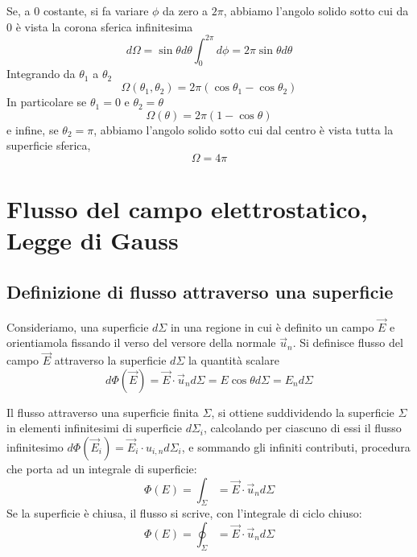 \documentclass[class=book, crop=false, oneside, 12pt]{standalone}
\begin{document}
Se, a \(0\) costante, si fa variare \(\phi\) da zero a \(2 \pi\), abbiamo l'angolo solido sotto cui da \(0\) è vista la corona sferica infinitesima
\begin{equation}
    d \Omega = \sin \theta d \theta \int_0^{2 \pi} d \phi = 2 \pi \sin \theta d \theta
\end{equation}
Integrando da \(\theta_1\) a \(\theta_2\)
\begin{equation*}
    \Omega (\theta_1 , \theta_2) = 2 \pi \left(\cos \theta_1 - \cos \theta_2 \right)
\end{equation*}
In particolare se \(\theta_1 = 0\) e \(\theta_2 = \theta\)
\begin{equation}
    \Omega (\theta) = 2 \pi (1- \cos \theta)
\end{equation}
e infine, se \(\theta_2 = \pi\), abbiamo l'angolo solido sotto cui dal centro è vista tutta la superficie sferica, 
\begin{equation}
    \Omega = 4 \pi
\end{equation}

\section{Flusso del campo elettrostatico, Legge di Gauss}

\subsection{Definizione di flusso attraverso una superficie}

Consideriamo, una superficie \( d \Sigma\) in una regione in cui è definito un campo \(\overrightarrow{E}\) e orientiamola fissando il verso del versore della normale \(\overrightarrow{u}_n\). 
Si definisce flusso del campo \(\overrightarrow{E}\) attraverso la superficie \(d \Sigma\) la quantità scalare 
\begin{equation}
    d \Phi (\overrightarrow{E}) = \overrightarrow{E} \cdot \overrightarrow{u}_n d \Sigma = E \cos \theta d \Sigma = E_n d \Sigma
\end{equation}

Il flusso attraverso una superficie finita \(\Sigma\), si ottiene suddividendo la superficie \(\Sigma\) in elementi infinitesimi di superficie \(d \Sigma_i\), calcolando per ciascuno di essi il flusso infinitesimo \(d \Phi (\overrightarrow{E}_i) = \overrightarrow{E}_i \cdot u_{i,n} d \Sigma_i\), 
e sommando gli infiniti contributi, procedura che porta ad un integrale di superficie:
\begin{equation}
    \Phi (E) = \int_{\Sigma} = \overrightarrow{E} \cdot \overrightarrow{u}_n d \Sigma
\end{equation}
Se la superficie è chiusa, il flusso si scrive, con l'integrale di ciclo chiuso:
\begin{equation} \label{flusso_superficie_chiusa}
    \Phi (E) = \oint_{\Sigma} = \overrightarrow{E} \cdot \overrightarrow{u}_n d \Sigma
\end{equation}
\end{document}
